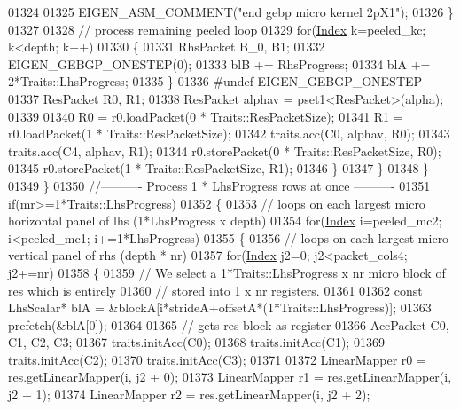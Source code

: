 \begin{DoxyCode}
01324 
01325             EIGEN\_ASM\_COMMENT(\textcolor{stringliteral}{"end gebp micro kernel 2pX1"});
01326           \}
01327 
01328           \textcolor{comment}{// process remaining peeled loop}
01329           \textcolor{keywordflow}{for}(\hyperlink{namespace_eigen_a62e77e0933482dafde8fe197d9a2cfde}{Index} k=peeled\_kc; k<depth; k++)
01330           \{
01331             RhsPacket B\_0, B1;
01332             EIGEN\_GEBGP\_ONESTEP(0);
01333             blB += RhsProgress;
01334             blA += 2*Traits::LhsProgress;
01335           \}
01336 \textcolor{preprocessor}{#undef EIGEN\_GEBGP\_ONESTEP}
01337           ResPacket R0, R1;
01338           ResPacket alphav = pset1<ResPacket>(alpha);
01339 
01340           R0 = r0.loadPacket(0 * Traits::ResPacketSize);
01341           R1 = r0.loadPacket(1 * Traits::ResPacketSize);
01342           traits.acc(C0, alphav, R0);
01343           traits.acc(C4, alphav, R1);
01344           r0.storePacket(0 * Traits::ResPacketSize, R0);
01345           r0.storePacket(1 * Traits::ResPacketSize, R1);
01346           \}
01347         \}
01348       \}
01349     \}
01350     \textcolor{comment}{//---------- Process 1 * LhsProgress rows at once ----------}
01351     \textcolor{keywordflow}{if}(mr>=1*Traits::LhsProgress)
01352     \{
01353       \textcolor{comment}{// loops on each largest micro horizontal panel of lhs (1*LhsProgress x depth)}
01354       \textcolor{keywordflow}{for}(\hyperlink{namespace_eigen_a62e77e0933482dafde8fe197d9a2cfde}{Index} i=peeled\_mc2; i<peeled\_mc1; i+=1*LhsProgress)
01355       \{
01356         \textcolor{comment}{// loops on each largest micro vertical panel of rhs (depth * nr)}
01357         \textcolor{keywordflow}{for}(\hyperlink{namespace_eigen_a62e77e0933482dafde8fe197d9a2cfde}{Index} j2=0; j2<packet\_cols4; j2+=nr)
01358         \{
01359           \textcolor{comment}{// We select a 1*Traits::LhsProgress x nr micro block of res which is entirely}
01360           \textcolor{comment}{// stored into 1 x nr registers.}
01361           
01362           \textcolor{keyword}{const} LhsScalar* blA = &blockA[i*strideA+offsetA*(1*Traits::LhsProgress)];
01363           prefetch(&blA[0]);
01364 
01365           \textcolor{comment}{// gets res block as register}
01366           AccPacket C0, C1, C2, C3;
01367           traits.initAcc(C0);
01368           traits.initAcc(C1);
01369           traits.initAcc(C2);
01370           traits.initAcc(C3);
01371 
01372           LinearMapper r0 = res.getLinearMapper(i, j2 + 0);
01373           LinearMapper r1 = res.getLinearMapper(i, j2 + 1);
01374           LinearMapper r2 = res.getLinearMapper(i, j2 + 2);

\end{DoxyCode}

